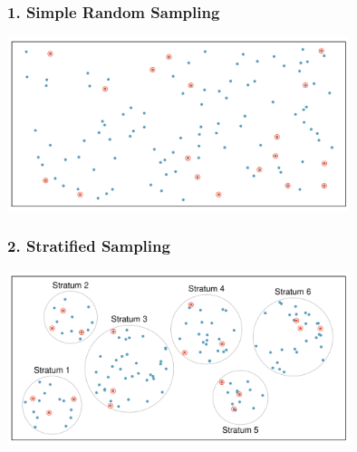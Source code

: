 \documentclass[handout]{beamer}
\newcommand{\blue}[1]{\textcolor{blue2}{#1}}
\begin{document}
\begin{frame}
\frametitle{1. Simple Random Sampling}

\begin{center}
\includegraphics[width=0.75\textwidth]{figure/simple.pdf}
\end{center}

%
%
\end{frame}


\begin{frame}[fragile]
\frametitle{2. Stratified Sampling}

\begin{center}
\includegraphics[width=0.75\textwidth]{figure/stratified.pdf}
\end{center}

%
%

\end{frame}
\end{document}
